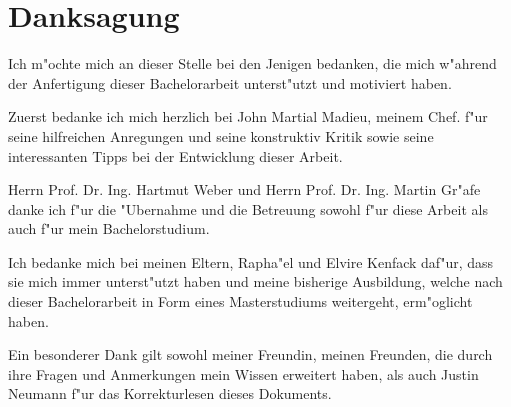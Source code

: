 \chapter{Danksagung}
Ich m"ochte mich an dieser Stelle bei den Jenigen bedanken, die mich w"ahrend der Anfertigung dieser Bachelorarbeit unterst"utzt und motiviert haben.

Zuerst bedanke ich mich herzlich bei John Martial Madieu, meinem Chef. f"ur seine hilfreichen Anregungen und seine konstruktiv Kritik sowie seine interessanten Tipps bei der Entwicklung dieser Arbeit.

Herrn Prof. Dr. Ing. Hartmut Weber und Herrn Prof. Dr. Ing. Martin Gr"afe danke ich f"ur die "Ubernahme und die Betreuung sowohl f"ur diese Arbeit als auch f"ur mein Bachelorstudium.

Ich bedanke mich bei meinen Eltern, Rapha"el und Elvire Kenfack daf"ur, dass sie mich immer unterst"utzt haben und meine bisherige Ausbildung, welche nach dieser Bachelorarbeit in Form eines Masterstudiums weitergeht, erm"oglicht haben. 

Ein besonderer Dank gilt sowohl meiner Freundin, meinen Freunden, die durch ihre Fragen und Anmerkungen mein Wissen erweitert haben, als auch Justin Neumann f"ur das Korrekturlesen dieses Dokuments.\\
\\[6ex]
 
%
%
